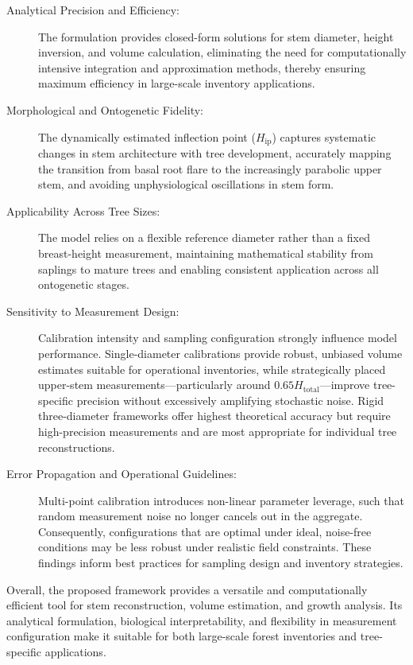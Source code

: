 \documentclass[twocolumn, bibliography=totoc]{scrartcl}
\begin{document}
\begin{description}
\item[Analytical Precision and Efficiency:] The formulation provides closed-form solutions for stem diameter, height inversion, and volume calculation, eliminating the need for computationally intensive integration and approximation methods, thereby ensuring maximum efficiency in large-scale inventory applications.
\item[Morphological and Ontogenetic Fidelity:] The dynamically estimated inflection point ($H_{\text{ip}}$) captures systematic changes in stem architecture with tree development, accurately mapping the transition from basal root flare to the increasingly parabolic upper stem, and avoiding unphysiological oscillations in stem form.
\item[Applicability Across Tree Sizes:] The model relies on a flexible reference diameter rather than a fixed breast-height measurement, maintaining mathematical stability from saplings to mature trees and enabling consistent application across all ontogenetic stages.
\item[Sensitivity to Measurement Design:] Calibration intensity and sampling configuration strongly influence model performance. Single-diameter calibrations provide robust, unbiased volume estimates suitable for operational inventories, while strategically placed upper-stem measurements---particularly around $0.65H_{\text{total}}$---improve tree-specific precision without excessively amplifying stochastic noise. Rigid three-diameter frameworks offer highest theoretical accuracy but require high-precision measurements and are most appropriate for individual tree reconstructions.
\item[Error Propagation and Operational Guidelines:] Multi-point calibration introduces non-linear parameter leverage, such that random measurement noise no longer cancels out in the aggregate. Consequently, configurations that are optimal under ideal, noise-free conditions may be less robust under realistic field constraints. These findings inform best practices for sampling design and inventory strategies.
\end{description}

Overall, the proposed framework provides a versatile and computationally efficient tool for stem reconstruction, volume estimation, and growth analysis. Its analytical formulation, biological interpretability, and flexibility in measurement configuration make it suitable for both large-scale forest inventories and tree-specific applications.


\printbibliography
 
\end{document}
